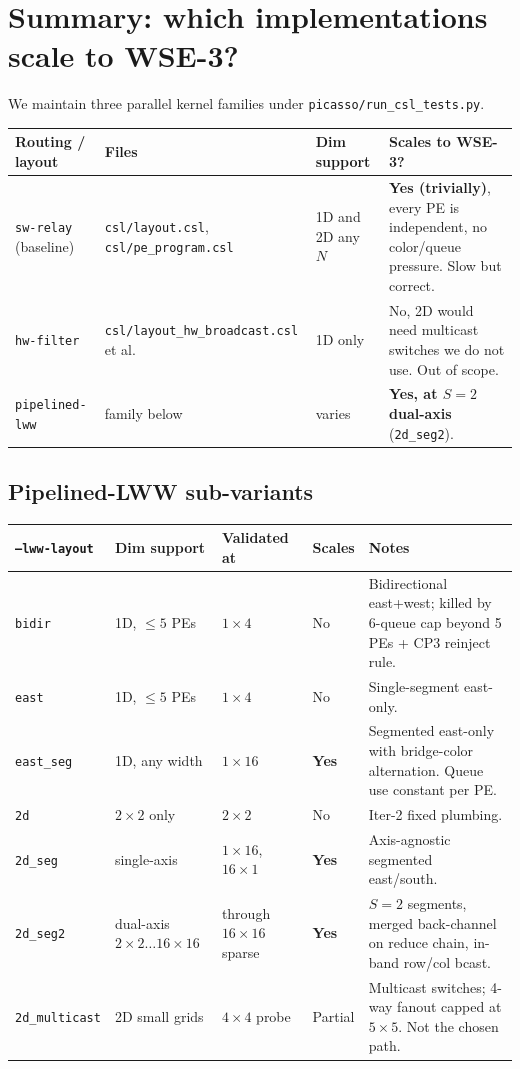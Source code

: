 \documentclass[11pt]{article}
\newcommand{\code}[1]{\texttt{#1}}
\newcommand{\file}[1]{\texttt{#1}}
\begin{document}
\section{Summary: which implementations scale to WSE-3?}

We maintain three parallel kernel families under
\file{picasso/run\_csl\_tests.py}.

\begin{longtable}{p{3.4cm} p{5.2cm} p{2.3cm} p{3.8cm}}
\toprule
Routing / layout & Files & Dim support & Scales to WSE-3? \\
\midrule
\endhead
\code{sw-relay} (baseline) & \file{csl/layout.csl}, \file{csl/pe\_program.csl} & 1D and 2D any $N$ & \textbf{Yes (trivially)}, every PE is independent, no color/queue pressure. Slow but correct. \\
\code{hw-filter} & \file{csl/layout\_hw\_broadcast.csl} et al. & 1D only & No, 2D would need multicast switches we do not use. Out of scope. \\
\code{pipelined-lww} & family below & varies & \textbf{Yes, at $S=2$ dual-axis} (\code{2d\_seg2}). \\
\bottomrule
\end{longtable}

\subsection{Pipelined-LWW sub-variants}

\begin{longtable}{p{2.4cm} p{3.7cm} p{2.2cm} p{1.6cm} p{4.0cm}}
\toprule
\code{--lww-layout} & Dim support & Validated at & Scales & Notes \\
\midrule
\endhead
\code{bidir} & 1D, $\le 5$ PEs & $1\times 4$ & No & Bidirectional east+west; killed by 6-queue cap beyond 5 PEs + CP3 reinject rule. \\
\code{east} & 1D, $\le 5$ PEs & $1\times 4$ & No & Single-segment east-only. \\
\code{east\_seg} & 1D, any width & $1\times 16$ & \textbf{Yes} & Segmented east-only with bridge-color alternation. Queue use constant per PE. \\
\code{2d} & $2\times 2$ only & $2\times 2$ & No & Iter-2 fixed plumbing. \\
\code{2d\_seg} & single-axis & $1\times 16$, $16\times 1$ & \textbf{Yes} & Axis-agnostic segmented east/south. \\
\code{2d\_seg2} & dual-axis $2\times 2\ldots 16\times 16$ & through $16\times 16$ sparse & \textbf{Yes} & $S=2$ segments, merged back-channel on reduce chain, in-band row/col bcast. \\
\code{2d\_multicast} & 2D small grids & $4\times 4$ probe & Partial & Multicast switches; 4-way fanout capped at $5\times 5$. Not the chosen path. \\
\bottomrule
\end{longtable}
\end{document}
